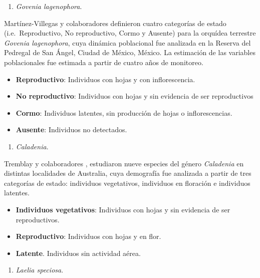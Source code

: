 \documentclass[
]{book}
\providecommand{\tightlist}{%
  \setlength{\itemsep}{0pt}\setlength{\parskip}{0pt}}
\theoremstyle{definition}
\theoremstyle{definition}
\theoremstyle{definition}
\theoremstyle{definition}
\theoremstyle{remark}
\begin{document}
\begin{enumerate}
\def\labelenumi{\alph{enumi})}
\setcounter{enumi}{1}
\tightlist
\item
  \emph{Govenia lagenophora}.
\end{enumerate}

Martínez-Villegas y colaboradores \citep{martinez2024estimation} definieron cuatro categorías de estado (i.e.~Reproductivo, No reproductivo, Cormo y Ausente) para la orquídea terrestre \emph{Govenia lagenophora}, cuya dinámica poblacional fue analizada en la Reserva del Pedregal de San Ángel, Ciudad de México, México.
La estimación de las variables poblacionales fue estimada a partir de cuatro años de monitoreo.

\begin{itemize}
\item
  \textbf{Reproductivo}: Individuos con hojas y con inflorescencia.
\item
  \textbf{No reproductivo}: Individuos con hojas y sin evidencia de ser reproductivos
\item
  \textbf{Cormo}: Individuos latentes, sin producción de hojas o inflorescencias.
\item
  \textbf{Ausente}: Individuos no detectados.
\end{itemize}

\begin{enumerate}
\def\labelenumi{\alph{enumi})}
\setcounter{enumi}{2}
\tightlist
\item
  \emph{Caladenia}.
\end{enumerate}

Tremblay y colaboradores \citep{tremblay2009dormancy, tremblay2009population}, estudiaron nueve especies del género \emph{Caladenia} en distintas localidades de Australia, cuya demografía fue analizada a partir de tres categorías de estado: individuos vegetativos, individuos en floración e individuos latentes.

\begin{itemize}
\tightlist
\item
  \textbf{Individuos vegetativos}: Individuos con hojas y sin evidencia de ser reproductivos.
\item
  \textbf{Reproductivo}: Individuos con hojas y en flor.
\item
  \textbf{Latente}. Individuos sin actividad aérea.
\end{itemize}

\begin{enumerate}
\def\labelenumi{\alph{enumi})}
\setcounter{enumi}{3}
\tightlist
\item
  \emph{Laelia speciosa}.
\end{enumerate}
\end{document}
